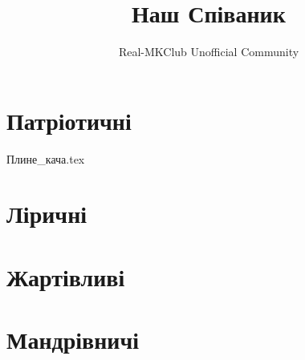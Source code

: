 \documentclass[b5paper,pagesize,10pt]{scrbook}
\title{Наш Співаник}
\author{Real-MKClub Unofficial Community}
\begin{document}
\maketitle
\chapter{Патріотичні}

{Плине_кача.tex}







\chapter{Ліричні}











\chapter{Жартівливі}




\chapter{Мандрівничі}


\tableofcontents
\end{document}
